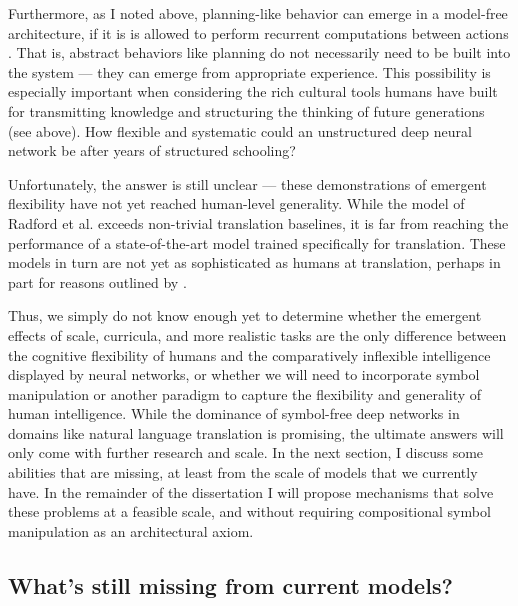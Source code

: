 Furthermore, as I noted above, planning-like behavior can emerge in a model-free architecture, if it is is allowed to perform recurrent computations between actions \cite{Guez2019}. That is, abstract behaviors like planning do not necessarily need to be built into the system --- they can emerge from appropriate experience. This possibility is especially important when considering the rich cultural tools humans have built for transmitting knowledge and structuring the thinking of future generations (see above). How flexible and systematic could an unstructured deep neural network be after years of structured schooling? \par 
Unfortunately, the answer is still unclear --- these demonstrations of emergent flexibility have not yet reached human-level generality. While the model of Radford et al. exceeds non-trivial translation baselines, it is far from reaching the performance of a state-of-the-art model trained specifically for translation. These models in turn are not yet as sophisticated as humans at translation, perhaps in part for reasons outlined by \citet{McClelland2019}. \par
Thus, we simply do not know enough yet to determine whether the emergent effects of scale, curricula, and more realistic tasks are the only difference between the cognitive flexibility of humans and the comparatively inflexible intelligence displayed by neural networks, or whether we will need to incorporate symbol manipulation or another paradigm to capture the flexibility and generality of human intelligence. While the dominance of symbol-free deep networks in domains like natural language translation is promising, the ultimate answers will only come with further research and scale. In the next section, I discuss some abilities that are missing, at least from the scale of models that we currently have. In the remainder of the dissertation I will propose mechanisms that solve these problems at a feasible scale, and without requiring compositional symbol manipulation as an architectural axiom. \par 

\subsection{What's still missing from current models?}

